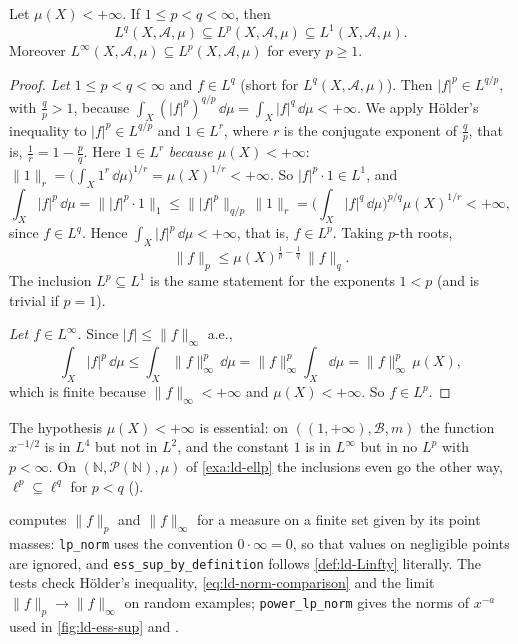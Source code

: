 \begin{proposition}\label{prop:ld-inclusions}
Let $\mu(X)<+\infty$. If $1\le p<q<\infty$, then
\[
  L^q(X,\mathcal A,\mu)\subseteq L^p(X,\mathcal A,\mu)\subseteq L^1(X,\mathcal A,\mu).
\]
Moreover $L^\infty(X,\mathcal A,\mu)\subseteq L^p(X,\mathcal A,\mu)$ for every $p\ge1$.
\end{proposition}

\begin{proof}
\emph{Let $1\le p<q<\infty$} and $f\in L^q$ (short for $L^q(X,\mathcal A,\mu)$). Then
$|f|^p\in L^{q/p}$, with $\frac qp>1$, because $\int_X(|f|^p)^{q/p}\,\dd\mu=\int_X|f|^q\,\dd\mu<+\infty$.
We apply H\"older's inequality to $|f|^p\in L^{q/p}$ and $1\in L^r$, where $r$ is the
conjugate exponent of $\frac qp$, that is, $\frac1r=1-\frac pq$. Here $1\in L^r$ \emph{because
$\mu(X)<+\infty$}: $\|1\|_r=\big(\int_X1^r\,\dd\mu\big)^{1/r}=\mu(X)^{1/r}<+\infty$. So
$|f|^p\cdot1\in L^1$, and
\[
  \int_X|f|^p\,\dd\mu=\big\||f|^p\cdot1\big\|_1\le\big\||f|^p\big\|_{q/p}\,\|1\|_r
  =\Big(\int_X|f|^q\,\dd\mu\Big)^{p/q}\mu(X)^{1/r}<+\infty,
\]
since $f\in L^q$. Hence $\int_X|f|^p\,\dd\mu<+\infty$, that is, $f\in L^p$. Taking $p$-th roots,
\begin{equation}\label{eq:ld-norm-comparison}
  \|f\|_p\le\mu(X)^{\frac1p-\frac1q}\,\|f\|_q .
\end{equation}
The inclusion $L^p\subseteq L^1$ is the same statement for the exponents $1<p$ (and is trivial
if $p=1$).

\emph{Let $f\in L^\infty$.} Since $|f|\le\|f\|_\infty$ a.e.,
\[
  \int_X|f|^p\,\dd\mu\le\int_X\|f\|_\infty^p\,\dd\mu=\|f\|_\infty^p\int_X\dd\mu=\|f\|_\infty^p\,\mu(X),
\]
which is finite because $\|f\|_\infty<+\infty$ and $\mu(X)<+\infty$. So $f\in L^p$.
\end{proof}

The hypothesis $\mu(X)<+\infty$ is essential: on $((1,+\infty),\mathcal B,m)$ the function
$x^{-1/2}$ is in $L^4$ but not in $L^2$, and the constant $1$ is in $L^\infty$ but in no $L^p$
with $p<\infty$. On $(\mathbb N,\mathcal P(\mathbb N),\mu)$ of \cref{exa:ld-ellp} the inclusions
even go the other way, $\ell^p\subseteq\ell^q$ for $p<q$ ().

\begin{remark}[Computational]\label{rem:ld-Lp-code}
 computes $\|f\|_p$ and $\|f\|_\infty$ for a measure on a
finite set given by its point masses: \texttt{lp\_norm} uses the convention $0\cdot\infty=0$, so
that values on negligible points are ignored, and \texttt{ess\_sup\_by\_definition} follows
\cref{def:ld-Linfty} literally. The tests check H\"older's inequality, \eqref{eq:ld-norm-comparison}
and the limit $\|f\|_p\to\|f\|_\infty$ on random examples; \texttt{power\_lp\_norm} gives the
norms of $x^{-a}$ used in \cref{fig:ld-ess-sup} and .
\end{remark}


